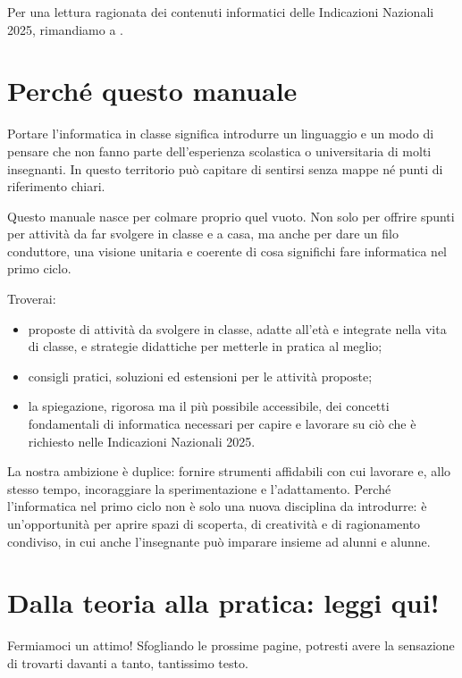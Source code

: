 Per una lettura ragionata dei contenuti informatici delle Indicazioni Nazionali 2025, rimandiamo a \textcite{lodi-lonati-2026}.

\section{Perché questo manuale }\label{perchuxe9-questo-manuale}

Portare l'informatica in classe significa introdurre un linguaggio e un modo di pensare che non fanno parte dell'esperienza scolastica o universitaria di molti insegnanti. In questo territorio può capitare di sentirsi senza mappe né punti di riferimento chiari.

Questo manuale nasce per colmare proprio quel vuoto. Non solo per offrire spunti per attività da far svolgere in classe e a casa, ma anche per dare un filo conduttore, una visione unitaria e coerente di cosa significhi fare informatica nel primo ciclo.

Troverai:

\begin{itemize}
\item
  proposte di attività da svolgere in classe, adatte all'età e integrate nella vita di classe, e strategie didattiche per metterle in pratica al meglio;
\item
  consigli pratici, soluzioni ed estensioni per le attività proposte;
\item
  la spiegazione, rigorosa ma il più possibile accessibile, dei concetti fondamentali di informatica necessari per capire e lavorare su ciò che è richiesto nelle Indicazioni Nazionali 2025.
\end{itemize}

La nostra ambizione è duplice: fornire strumenti affidabili con cui lavorare e, allo stesso tempo, incoraggiare la sperimentazione e l'adattamento. Perché l'informatica nel primo ciclo non è solo una nuova disciplina da introdurre: è un'opportunità per aprire spazi di scoperta, di creatività e di ragionamento condiviso, in cui anche l'insegnante può imparare insieme ad alunni e alunne.

\section{Dalla teoria alla pratica: leggi qui!}

Fermiamoci un attimo! Sfogliando le prossime pagine, potresti avere la sensazione di trovarti davanti a tanto, tantissimo testo.  

